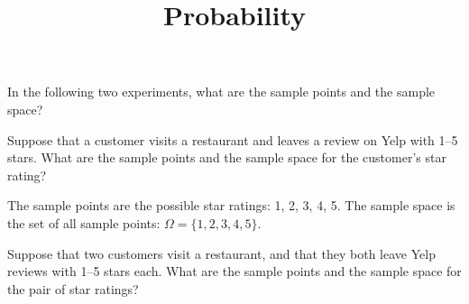 \documentclass[answers,11pt]{exam}
\title{Probability}
\begin{document}
\begin{questions}



\question In the following two experiments, what are the sample points and the
sample space?



\question Suppose that a customer visits a restaurant and leaves a review on
Yelp with 1--5 stars.  What are the sample points and the sample space for the
customer's star rating?

\begin{solution}
The sample points are the possible star ratings: 1, 2, 3, 4, 5.  The sample
space is the set of all sample points: $\Omega = \{ 1, 2, 3, 4, 5 \}$.
\end{solution}



\question Suppose that two customers visit a restaurant, and that they both
leave Yelp reviews with 1--5 stars each.
What are the sample points and the sample space for the pair of star ratings?


\end{questions}
\end{document}
